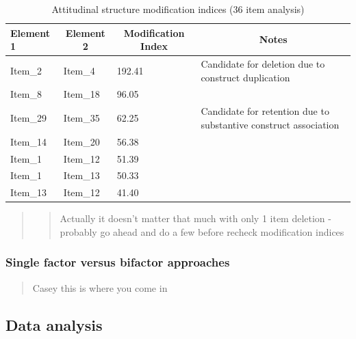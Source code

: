\documentclass[
  english,
  man]{apa7}
\begin{document}
\begin{table}[tbp]

\begin{center}
\begin{threeparttable}

\caption{\label{tab:modindices}Attitudinal structure modification indices (36 item analysis)}

\begin{tabular}{llll}
\toprule
Element 1 & \multicolumn{1}{c}{Element 2} & \multicolumn{1}{c}{Modification Index} & \multicolumn{1}{c}{Notes}\\
\midrule
Item\_2 & Item\_4 & 192.41 & Candidate for deletion due to construct duplication\\
Item\_8 & Item\_18 & 96.05 & \\
Item\_29 & Item\_35 & 62.25 & Candidate for retention due to substantive construct association\\
Item\_14 & Item\_20 & 56.38 & \\
Item\_1 & Item\_12 & 51.39 & \\
Item\_1 & Item\_13 & 50.33 & \\
Item\_13 & Item\_12 & 41.40 & \\
\bottomrule
\end{tabular}

\end{threeparttable}
\end{center}

\end{table}

\begin{quote}
\begin{quote}
Actually it doesn't matter that much with only 1 item deletion - probably go ahead and do a few before recheck modification indices
\end{quote}
\end{quote}

\hypertarget{single-factor-versus-bifactor-approaches}{%
\subsubsection{Single factor versus bifactor approaches}\label{single-factor-versus-bifactor-approaches}}

\begin{quote}
Casey this is where you come in
\end{quote}

\hypertarget{data-analysis}{%
\subsection{Data analysis}\label{data-analysis}}
\end{document}
